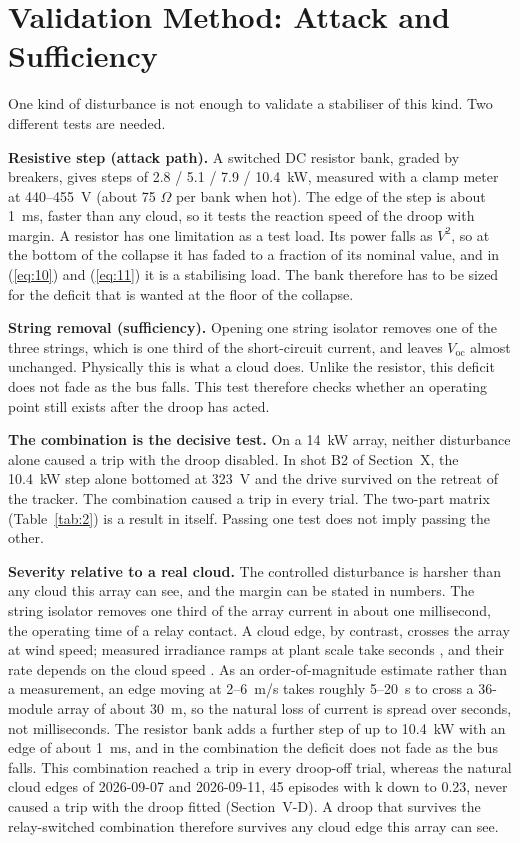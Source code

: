 \documentclass[journal]{IEEEtran}
\begin{document}
\section{Validation Method: Attack and Sufficiency}

One kind of disturbance is not enough to validate a stabiliser of this kind. Two different tests are needed.

\textbf{Resistive step (attack path).} A switched DC resistor bank, graded by breakers, gives steps of 2.8 / 5.1 / 7.9 / 10.4~kW, measured with a clamp meter at 440--455~V (about 75 $\Omega$ per bank when hot). The edge of the step is about 1~ms, faster than any cloud, so it tests the reaction speed of the droop with margin. A resistor has one limitation as a test load. Its power falls as $V^{2}$, so at the bottom of the collapse it has faded to a fraction of its nominal value, and in (\ref{eq:10}) and (\ref{eq:11}) it is a stabilising load. The bank therefore has to be sized for the deficit that is wanted at the floor of the collapse.

\textbf{String removal (sufficiency).} Opening one string isolator removes one of the three strings, which is one third of the short-circuit current, and leaves $V_{\mathrm{oc}}$ almost unchanged. Physically this is what a cloud does. Unlike the resistor, this deficit does not fade as the bus falls. This test therefore checks whether an operating point still exists after the droop has acted.

\textbf{The combination is the decisive test.} On a 14~kW array, neither disturbance alone caused a trip with the droop disabled. In shot B2 of Section~X, the 10.4~kW step alone bottomed at 323~V and the drive survived on the retreat of the tracker. The combination caused a trip in every trial. The two-part matrix (Table~\ref{tab:2}) is a result in itself. Passing one test does not imply passing the other.

\textbf{Severity relative to a real cloud.} The controlled disturbance is harsher than any cloud this array can see, and the margin can be stated in numbers. The string isolator removes one third of the array current in about one millisecond, the operating time of a relay contact. A cloud edge, by contrast, crosses the array at wind speed; measured irradiance ramps at plant scale take seconds \cite{r24}, and their rate depends on the cloud speed \cite{r25}. As an order-of-magnitude estimate rather than a measurement, an edge moving at 2--6~m/s takes roughly 5--20~s to cross a 36-module array of about 30~m, so the natural loss of current is spread over seconds, not milliseconds. The resistor bank adds a further step of up to 10.4~kW with an edge of about 1~ms, and in the combination the deficit does not fade as the bus falls. This combination reached a trip in every droop-off trial, whereas the natural cloud edges of 2026-09-07 and 2026-09-11, 45 episodes with k down to 0.23, never caused a trip with the droop fitted (Section~V-D). A droop that survives the relay-switched combination therefore survives any cloud edge this array can see.
\end{document}
